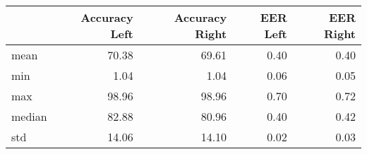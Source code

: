 \begin{tabular}{lrrrr}
\toprule
{} &  Accuracy Left &  Accuracy Right &  EER Left &  EER Right \\
\midrule
mean   &          70.38 &           69.61 &      0.40 &       0.40 \\
min    &           1.04 &            1.04 &      0.06 &       0.05 \\
max    &          98.96 &           98.96 &      0.70 &       0.72 \\
median &          82.88 &           80.96 &      0.40 &       0.42 \\
std    &          14.06 &           14.10 &      0.02 &       0.03 \\
\bottomrule
\end{tabular}
